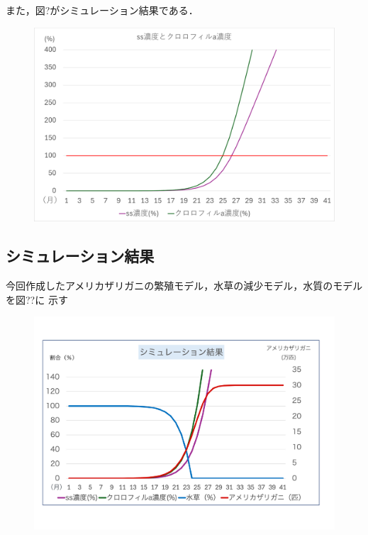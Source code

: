 \documentclass[12pt,a4j,titlepage]{ltjsarticle}
\begin{document}
{{また，図?がシミュレーション結果である．

{\begin{figure}[h]
 \begin{center}
   \includegraphics[width=.95\columnwidth]{SS_Chl_graph.pdf}
 \end{center}
 \end{figure}

\newpage
\subsection{シミュレーション結果}
今回作成したアメリカザリガニの繁殖モデル，水草の減少モデル，水質のモデルを図??に
示す
{\begin{figure}[h]
 \begin{center}
   \includegraphics[width=.95\columnwidth]{graph6.pdf}
 \end{center}
 \end{figure}
\clearpage
}}}}
\end{document}
